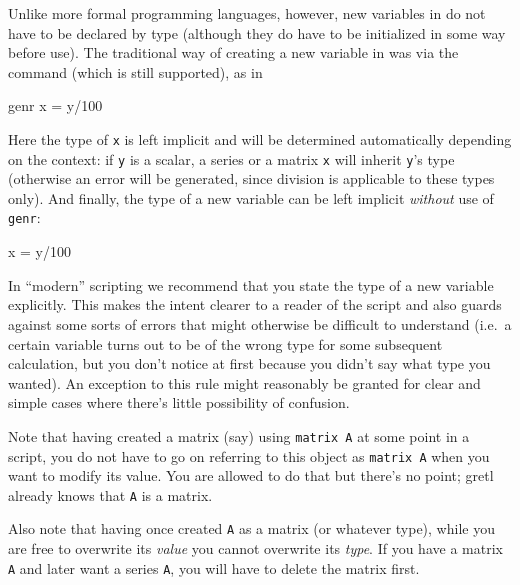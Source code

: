 Unlike more formal programming languages, however, new variables in
 do not have to be declared by type (although they do have
to be initialized in some way before use).  The traditional way of
creating a new variable in  was via the  command
(which is still supported), as in

\begin{code}
genr x = y/100
\end{code}

Here the type of \texttt{x} is left implicit and will be determined
automatically depending on the context: if \texttt{y} is a scalar,
a series or a matrix \texttt{x} will inherit \texttt{y}'s type
(otherwise an error will be generated, since division is applicable to
these types only). And finally, the type of a new variable can be left
implicit \textit{without} use of \texttt{genr}:

\begin{code}
x = y/100
\end{code}

In ``modern''  scripting we recommend that you state the
type of a new variable explicitly. This makes the intent clearer to a
reader of the script and also guards against some sorts of errors that
might otherwise be difficult to understand (i.e.\ a certain variable
turns out to be of the wrong type for some subsequent calculation, but
you don't notice at first because you didn't say what type you
wanted). An exception to this rule might reasonably be granted for
clear and simple cases where there's little possibility of confusion.

Note that having created a matrix (say) using \texttt{matrix A} at
some point in a script, you do not have to go on referring to this
object as \texttt{matrix A} when you want to modify its value. You are
allowed to do that but there's no point; gretl already knows that
\texttt{A} is a matrix.

Also note that having once created \texttt{A} as a matrix (or whatever
type), while you are free to overwrite its \textit{value} you cannot
overwrite its \textit{type}. If you have a matrix \texttt{A} and later
want a series \texttt{A}, you will have to delete the matrix first.



